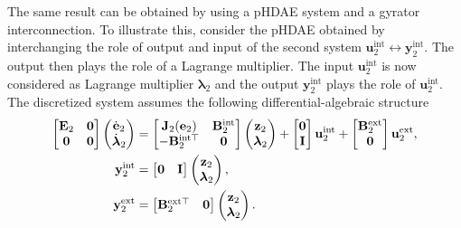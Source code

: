 The same result can be obtained by using a pHDAE system and a gyrator interconnection. To illustrate this, consider the pHDAE obtained by interchanging the role of output and input of the second system $\mathbf{u}_2^{\text{int}} \leftrightarrow \mathbf{y}_2^{\text{int}}$. The output then plays the role of a Lagrange multiplier. The input $\mathbf{u}_2^{\text{int}}$ is now considered as Lagrange multiplier ${\bm{\lambda}}_2$ and the output $\mathbf{y}_2^{\text{int}}$ plays the role of $\mathbf{u}_2^{\text{int}}$. The discretized system assumes the following differential-algebraic structure
\begin{equation}
\begin{aligned}
\begin{bmatrix}
\mathbf{E}_2 & \mathbf{0} \\
\mathbf{0} & \mathbf{0} \\
\end{bmatrix} \begin{pmatrix}
\dot{\mathbf{e}}_2 \\
\dot{\bm{\lambda}}_2 \\
\end{pmatrix}
&= \begin{bmatrix}
\mathbf{J}_2(\mathbf{e}_2) & \mathbf{B}_2^{\text{int}} \\
-\mathbf{B}_2^{\text{int} \top} & \mathbf{0}\\
\end{bmatrix} \begin{pmatrix}
\mathbf{z}_2 \\
{\bm{\lambda}}_2
\end{pmatrix} 
+ \begin{bmatrix}
\mathbf{0} \\
\mathbf{I}
\end{bmatrix} \mathbf{u}_2^{\text{int}} + \begin{bmatrix}
\mathbf{B}_2^{\text{ext}} \\
\mathbf{0} \\
\end{bmatrix} \mathbf{u}_2^{\text{ext}},  \vspace{2mm} \\
\mathbf{y}_2^{\text{int}} &= \begin{bmatrix}
\mathbf{0} & \mathbf{I}
\end{bmatrix}\begin{pmatrix}
\mathbf{z}_2 \\
{\bm{\lambda}}_2
\end{pmatrix}, \\
\mathbf{y}_2^{\text{ext}} &= \begin{bmatrix}
\mathbf{B}_2^{\text{ext} \top} & \mathbf{0}
\end{bmatrix}\begin{pmatrix}
\mathbf{z}_2 \\
{\bm{\lambda}}_2
\end{pmatrix}.
\end{aligned}
\end{equation}
